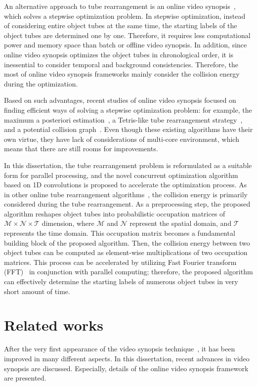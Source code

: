 \documentclass[11pt]{hyu_thesis}
\begin{document}
An alternative approach to tube rearrangement is an online video synopsis~\cite{Huang2014,ShikunFeng2012,JianqingZhu2015,He2017,Fu2014}, which solves a stepwise optimization problem. In stepwise optimization, instead of considering entire object tubes at the same time, the starting labels of the object tubes are determined one by one. Therefore, it requires less computational power and memory space than batch or offline video synopsis. In addition, since online video synopsis optimizes the object tubes in chronological order, it is inessential to consider temporal and background consistencies. Therefore, the most of online video synopsis frameworks mainly consider the collision energy during the optimization.

Based on such advantages, recent studies of online video synopsis focused on finding efficient ways of solving a stepwise optimization problem: for example, the maximum a posteriori estimation~\cite{Huang2014}, a Tetris-like tube rearrangement strategy~\cite{ShikunFeng2012,JianqingZhu2015}, and a potential collision graph~\cite{He2017}. 
Even though these existing algorithms have their own virtue, they have lack of considerations of multi-core environment, which means that there are still rooms for improvements.

In this dissertation, the tube rearrangement problem is reformulated as a suitable form for parallel processing, and the novel concurrent optimization algorithm based on 1D convolutions is proposed to accelerate the optimization process. As in other online tube rearrangement algorithms~\cite{Huang2014,ShikunFeng2012,JianqingZhu2015,He2017,Fu2014}, the collision energy is primarily considered during the tube rearrangement. As a preprocessing step, the proposed algorithm reshapes object tubes into probabilistic occupation matrices of $\mathcal{M} \times \mathcal{N} \times \mathcal{T}$ dimension, where $\mathcal{M}$ and $\mathcal{N}$ represent the spatial domain, and $\mathcal{T}$ represents the time domain. This occupation matrix becomes a fundamental building block of the proposed algorithm. Then, the collision energy between two object tubes can be computed as element-wise multiplications of two occupation matrices. This process can be accelerated by utilizing Fast Fourier transform (FFT)~\cite{Oppenheim2009} in conjunction with parallel computing; therefore, the proposed algorithm can effectively determine the starting labels of numerous object tubes in very short amount of time.

\section{Related works}
\label{sec:intro:related}
After the very first appearance of the video synopsis technique~\cite{Rav-Acha2006}, it has been improved in many different aspects. In this dissertation, recent advances in video synopsis are discussed. Especially, details of the online video synopsis framework are presented.
\end{document}

